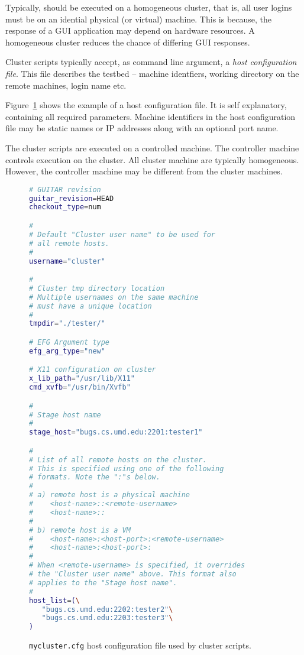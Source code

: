 Typically, \mddozen{} should be executed on a homogeneous cluster, that is, all user logins must be on an idential physical (or virtual) machine. This is because, the response of a GUI application may depend on hardware resources. A homogeneous cluster reduces the chance of differing GUI responses.

Cluster scripts typically accept, as command line argument, a \textit{host configuration file}. This file describes the testbed -- machine identfiers, working directory on the remote machines, login name etc.


Figure~\ref{fig:hostcfg} shows the example of a host configuration file. It is self explanatory, containing all required parameters. Machine identifiers in the host configuration file may be static names or IP addresses along with an optional port name.

The cluster scripts are executed on a controlled machine. The controller machine controls execution on the cluster. All cluster machine are typically homogeneous. However, the controller machine may be different from the cluster machines.

\begin{figure}
\scriptsize{
   \begin{lstlisting}[language=sh, showstringspaces=false, breaklines=true]
# GUITAR revision
guitar_revision=HEAD
checkout_type=num

#
# Default "Cluster user name" to be used for
# all remote hosts.
#
username="cluster"

#
# Cluster tmp directory location
# Multiple usernames on the same machine
# must have a unique location
#
tmpdir="./tester/"

# EFG Argument type
efg_arg_type="new"

# X11 configuration on cluster
x_lib_path="/usr/lib/X11"
cmd_xvfb="/usr/bin/Xvfb"

#
# Stage host name
# 
stage_host="bugs.cs.umd.edu:2201:tester1"

#
# List of all remote hosts on the cluster.
# This is specified using one of the following
# formats. Note the ":"s below.
#
# a) remote host is a physical machine
#    <host-name>::<remote-username>
#    <host-name>::
#
# b) remote host is a VM
#    <host-name>:<host-port>:<remote-username>
#    <host-name>:<host-port>:
#
# When <remote-username> is specified, it overrides
# the "Cluster user name" above. This format also
# applies to the "Stage host name".
#
host_list=(\
   "bugs.cs.umd.edu:2202:tester2"\
   "bugs.cs.umd.edu:2203:tester3"\
)
   \end{lstlisting}

}
   \caption{\texttt{mycluster.cfg} host configuration file used by cluster scripts.}
   \label{fig:hostcfg}
\end{figure}


